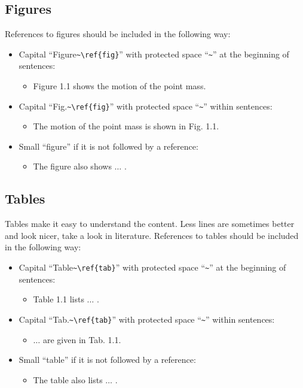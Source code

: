 \subsection{Figures}

References to figures should be included in the following way:
\begin{itemize}
	\item Capital ``Figure\verb|~\ref{fig}|'' with protected space ``\verb|~|'' at the beginning of sentences:
	\begin{itemize}
		\item Figure 1.1 shows the motion of the point mass.
	\end{itemize}
	\item Capital ``Fig.\verb|~\ref{fig}|'' with protected space ``\verb|~|'' within sentences:
	\begin{itemize}
		\item The motion of the point mass is shown in Fig. 1.1.
	\end{itemize}
	\item Small ``figure'' if it is not followed by a reference:
	\begin{itemize}
		\item The figure also shows $\ldots$ .
	\end{itemize}
\end{itemize}

\subsection{Tables}

Tables make it easy to understand the content. Less lines are sometimes better and look nicer, take a look in literature.
References to tables should be included in the following way:
\begin{itemize}
	\item Capital ``Table\verb|~\ref{tab}|'' with protected space ``\verb|~|''  at the beginning of sentences:
	\begin{itemize}
		\item Table 1.1 lists $\ldots$ .
	\end{itemize}
	\item Capital ``Tab.\verb|~\ref{tab}|'' with protected space ``\verb|~|''  within sentences:
	\begin{itemize}
		\item $\ldots$ are given in Tab. 1.1.
	\end{itemize}
	\item Small ``table'' if it is not followed by a reference:
	\begin{itemize}
		\item The table also lists $\ldots$ .
	\end{itemize}
\end{itemize}	

